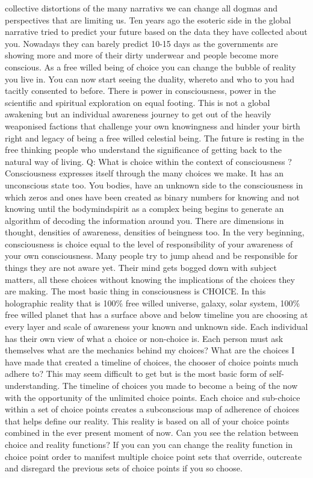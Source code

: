 collective distortions of the many narrativs we can change all dogmas
and perspectives that are limiting us. Ten years ago the esoteric side
in the global narrative tried to predict your future based on the data
they have collected about you. Nowadays they can barely predict 10-15
days as the governments are showing more and more of their dirty
underwear and people become more conscious. As a free willed being of
choice you can change the bubble of reality you live in. You can now
start seeing the duality, whereto and who to you had tacitly consented
to before. There is power in consciousness, power in the scientific and
spiritual exploration on equal footing. This is not a global awakening
but an individual awareness journey to get out of the heavily weaponised
factions that challenge your own knowingness and hinder your birth right
and legacy of being a free willed celestial being. The future is resting
in the free thinking people who understand the significance of getting
back to the natural way of living. Q: What is choice within the context
of consciousness ? Consciousness expresses itself through the many
choices we make. It has an unconscious state too. You bodies, have an
unknown side to the consciousness in which zeros and ones have been
created as binary numbers for knowing and not knowing until the
bodymindspirit as a complex being begins to generate an algorithm of
decoding the information around you. There are dimensions in thought,
densities of awareness, densities of beingness too. In the very
beginning, consciousness is choice equal to the level of responsibility
of your awareness of your own consciousness. Many people try to jump
ahead and be responsible for things they are not aware yet. Their mind
gets bogged down with subject matters, all these choices without knowing
the implications of the choices they are making. The most basic thing in
consciousness is CHOICE. In this holographic reality that is 100\% free
willed universe, galaxy, solar system, 100\% free willed planet that has
a surface above and below timeline you are choosing at every layer and
scale of awareness your known and unknown side. Each individual has
their own view of what a choice or non-choice is. Each person must ask
themselves what are the mechanics behind my choices? What are the
choices I have made that created a timeline of choices, the chooser of
choice points much adhere to? This may seem difficult to get but is the
most basic form of self-understanding. The timeline of choices you made
to become a being of the now with the opportunity of the unlimited
choice points. Each choice and sub-choice within a set of choice points
creates a subconscious map of adherence of choices that helps define our
reality. This reality is based on all of your choice points combined in
the ever present moment of now. Can you see the relation between choice
and reality functions? If you can you can change the reality function in
choice point order to manifest multiple choice point sets that override,
outcreate and disregard the previous sets of choice points if you so
choose.

